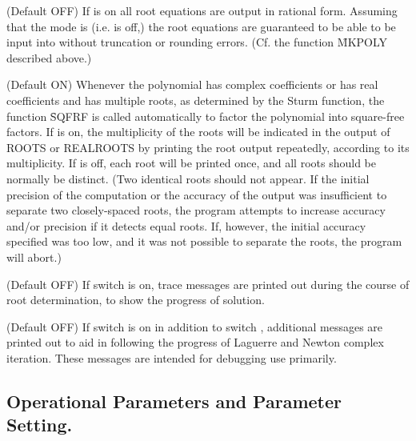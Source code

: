 \begin{description}
\hypertarget{switch:RATROOT}{}
\item[\sw{RATROOT}] (Default OFF) If  is on all root equations are
output in rational form.  Assuming that the mode is  (i.e.
 is off,) the root equations are
guaranteed to be able to be input into \REDUCE{} without truncation or
rounding errors. (Cf. the function \f{MKPOLY} described above.)

\hypertarget{switch:MULTIROOT}{}
\item[\sw{MULTIROOT}] (Default ON) Whenever the polynomial has complex
coefficients or has real coefficients and has multiple roots, as
 determined by the Sturm function, the function \f{SQFRF}
is called automatically to factor the polynomial into square-free factors.
If  is on, the multiplicity of the roots will be indicated
in the output of ROOTS or REALROOTS by printing the root output
repeatedly, according to its multiplicity.  If  is off,
each root will be printed once, and all roots should be normally be
distinct. (Two identical roots should not appear.  If the initial
precision of the computation or the accuracy of the output was
insufficient to separate two closely-spaced roots, the program attempts to
increase accuracy and/or precision if it detects equal roots.  If,
however, the initial accuracy specified was too low, and it was not
possible to separate the roots, the program will abort.)

\hypertarget{switch:TRROOT}{}
\item[\sw{TRROOT}] (Default OFF) If switch  is on, trace messages
are printed out during the course of root determination, to show the
progress of solution.

\hypertarget{switch:ROOTMSG}{}
\item[\sw{ROOTMSG}] (Default OFF) If switch
 is on in addition to switch , additional
messages are printed out to aid in following the progress of Laguerre and
Newton complex iteration.  These messages are intended for debugging use
primarily.


\end{description}


\subsection{Operational Parameters and Parameter Setting.}

